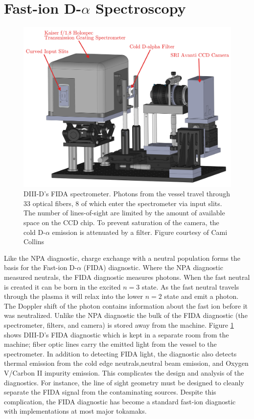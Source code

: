 \section{Fast-ion D-$\alpha$ Spectroscopy}
\begin{figure}[ht]
    \centering
    \includegraphics[width=12cm]{figures/d3d_fida.jpg}
    \caption{DIII-D's FIDA spectrometer\cite{muscatello2010}. Photons from the vessel travel through 33 optical fibers, 8 of which enter the spectrometer via input slits. The number of lines-of-sight are limited by the amount of available space on the CCD chip. To prevent saturation of the camera, the cold D-$\alpha$ emission is attenuated by a filter. Figure courtesy of Cami Collins}
    \label{fig:fida}
\end{figure}
Like the NPA diagnostic, charge exchange with a neutral population forms the basis for the Fast-ion D-$\alpha$ (FIDA) diagnostic\cite{heidbrink2004fida}. Where the NPA diagnostic measured neutrals, the FIDA diagnostic measures photons. When the fast neutral is created it can be born in the excited $n=3$ state. As the fast neutral travels through the plasma it will relax into the lower $n=2$ state and emit a photon. The Doppler shift of the photon contains information about the fast ion before it was neutralized. Unlike the NPA diagnostic the bulk of the FIDA diagnostic (the spectrometer, filters, and camera) is stored away from the machine. Figure \ref{fig:fida} shows DIII-D's FIDA diagnostic which is kept in a separate room from the machine; fiber optic lines carry the emitted light from the vessel to the spectrometer. In addition to detecting FIDA light, the diagnostic also detects thermal emission from the cold edge neutrals,neutral beam emission, and Oxygen V/Carbon II impurity emission. This complicates the design and analysis of the diagnostics. For instance, the line of sight geometry must be designed to cleanly separate the FIDA signal from the contaminating sources. Despite this complication, the FIDA diagnostic has become a standard fast-ion diagnostic with implementations at most major tokamaks\cite{heidbrink2010fast}.

